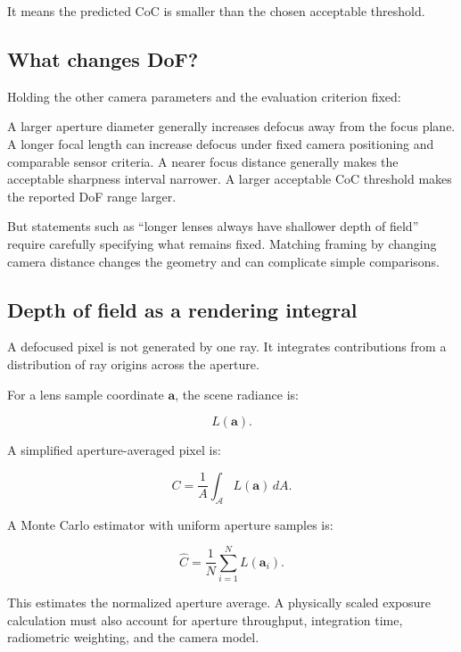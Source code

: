 It means the predicted CoC is smaller than the chosen acceptable threshold.

\subsection{What changes DoF?}\label{02-foundations-ii-ch036-what-changes-dof}

\hypertarget{02-foundations-ii-ch036-what-changes-dof}{}

Holding the other camera parameters and the evaluation criterion fixed:

A larger aperture diameter generally increases defocus away from the focus plane. A longer focal length can increase defocus under fixed camera positioning and comparable sensor criteria. A nearer focus distance generally makes the acceptable sharpness interval narrower. A larger acceptable CoC threshold makes the reported DoF range larger.

But statements such as ``longer lenses always have shallower depth of field'' require carefully specifying what remains fixed. Matching framing by changing camera distance changes the geometry and can complicate simple comparisons.

\subsection{Depth of field as a rendering integral}\label{02-foundations-ii-ch036-depth-of-field-as-a-rendering-integral}

\hypertarget{02-foundations-ii-ch036-depth-of-field-as-a-rendering-integral}{}

A defocused pixel is not generated by one ray. It integrates contributions from a distribution of ray origins across the aperture.

For a lens sample coordinate \(\mathbf a\), the scene radiance is:

\[ L(\mathbf a). \]

A simplified aperture-averaged pixel is:

\[ \boxed{ C= \frac1{A}\int_{\mathcal A}L(\mathbf a)\,dA. } \]

A Monte Carlo estimator with uniform aperture samples is:

\[ \boxed{ \widehat C= \frac1N\sum_{i=1}^{N}L(\mathbf a_i). } \]

This estimates the normalized aperture average. A physically scaled exposure calculation must also account for aperture throughput, integration time, radiometric weighting, and the camera model.

